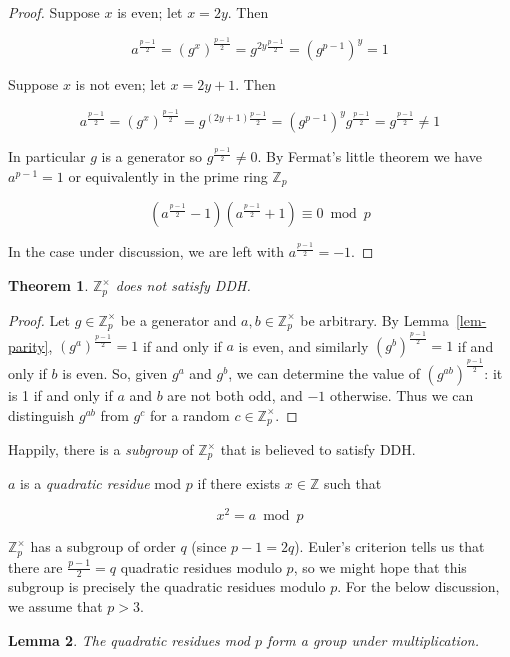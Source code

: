 \documentclass[12pt,a4paper]{article}
\newtheorem{theorem}{Theorem}
\newtheorem{lemma}[theorem]{Lemma}
\theoremstyle{definition}
\begin{document}
\begin{proof}
    Suppose $x$ is even; let $x=2y$. Then

    $$a^{\frac{p-1}{2}}=(g^x)^{\frac{p-1}{2}}=g^{2y\frac{p-1}{2}}=(g^{p-1})^y=1$$

    Suppose $x$ is not even; let $x=2y+1$. Then

    $$a^{\frac{p-1}{2}}=(g^x)^{\frac{p-1}{2}}=g^{(2y+1)\frac{p-1}{2}}=(g^{p-1})^yg^{\frac{p-1}{2}}=g^{\frac{p-1}{2}}\neq 1$$

    In particular $g$ is a generator so $g^\frac{p-1}{2}\neq 0$. By Fermat's little theorem we have $a^{p-1}=1$ or equivalently in the prime ring $\mathbb{Z}_p$

    $$\left(a^\frac{p-1}{2}-1\right)\left(a^\frac{p-1}{2}+1\right)\equiv 0\bmod p$$
    
    In the case under discussion, we are left with $a^\frac{p-1}{2}=-1$.
\end{proof}
\begin{theorem}
    $\mathbb{Z}^\times_p$ does not satisfy DDH.
\end{theorem}
\begin{proof}
    Let $g\in\mathbb{Z}^\times_p$ be a generator and $a,b\in\mathbb{Z}^\times_p$ be arbitrary. By Lemma~\ref{lem-parity}, $(g^a)^{\frac{p-1}{2}}=1$ if and only if $a$ is even, and similarly $(g^b)^{\frac{p-1}{2}}=1$ if and only if $b$ is even. So, given $g^a$ and $g^b$, we can determine the value of $\left(g^{ab}\right)^\frac{p-1}{2}$: it is 1 if and only if $a$ and $b$ are not both odd, and $-1$ otherwise. Thus we can distinguish $g^{ab}$ from $g^c$ for a random $c\in\mathbb{Z}^\times_p$.
\end{proof}
Happily, there is a \textit{subgroup} of $\mathbb{Z}^\times_p$ that is believed to satisfy DDH.
\begin{definition}
    $a$ is a \textit{quadratic residue} mod $p$ if there exists $x\in\mathbb{Z}$ such that

    $$x^2=a\bmod p$$

\end{definition}
$\mathbb{Z}^\times_p$ has a subgroup of order $q$ (since $p-1=2q$). Euler's criterion tells us that there are $\frac{p-1}{2}=q$ quadratic residues modulo $p$, so we might hope that this subgroup is precisely the quadratic residues modulo $p$. For the below discussion, we assume that $p>3$.
\begin{lemma}
    The quadratic residues mod $p$ form a group under multiplication.
\end{lemma}
\end{document}
